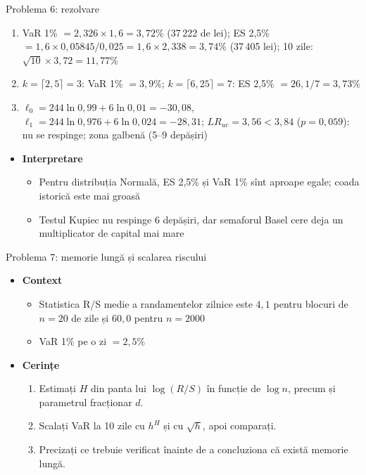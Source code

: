 \begin{frame}{Problema 6: rezolvare}
\itemsize{\footnotesize}
\begin{enumerate}
    \item VaR 1\% $= 2{,}326 \times 1{,}6 = 3{,}72\%$ (37\,222 de lei); ES 2,5\% $= 1{,}6 \times 0{,}05845/0{,}025 = 1{,}6 \times 2{,}338 = 3{,}74\%$ (37\,405 lei); 10 zile: $\sqrt{10} \times 3{,}72 = 11{,}77\%$
    \item $k = \lceil 2{,}5 \rceil = 3$: VaR 1\% $= 3{,}9\%$; $k = \lceil 6{,}25 \rceil = 7$: ES 2,5\% $= 26{,}1/7 = 3{,}73\%$
    \item $\ell_0 = 244\ln 0{,}99 + 6\ln 0{,}01 = -30{,}08$, $\ell_1 = 244\ln 0{,}976 + 6\ln 0{,}024 = -28{,}31$; $LR_{uc} = 3{,}56 < 3{,}84$ ($p = 0{,}059$): nu se respinge; zona galbenă (5--9 depășiri)
\end{enumerate}
\begin{itemize}
    \item \textbf{Interpretare}
    \begin{itemize}
        \item Pentru distribuția Normală, ES 2,5\% și VaR 1\% sînt aproape egale; coada istorică este mai groasă
        \item Testul Kupiec nu respinge 6 depășiri, dar semaforul Basel cere deja un multiplicator de capital mai mare
    \end{itemize}
\end{itemize}
\end{frame}

\begin{frame}{Problema 7: memorie lungă și scalarea riscului}
\itemsize{\footnotesize}
\begin{itemize}
    \item \textbf{Context}
    \begin{itemize}
        \item Statistica R/S medie a randamentelor zilnice este $4{,}1$ pentru blocuri de $n = 20$ de zile și $60{,}0$ pentru $n = 2000$
        \item VaR 1\% pe o zi $= 2{,}5\%$
    \end{itemize}
    \item \textbf{Cerințe}
\begin{enumerate}
    \item Estimați $H$ din panta lui $\log(R/S)$ în funcție de $\log n$, precum și parametrul fracționar $d$.
    \item Scalați VaR la 10 zile cu $h^H$ și cu $\sqrt{h}$, apoi comparați.
    \item Precizați ce trebuie verificat înainte de a concluziona că există memorie lungă.
\end{enumerate}
\end{itemize}
\end{frame}

